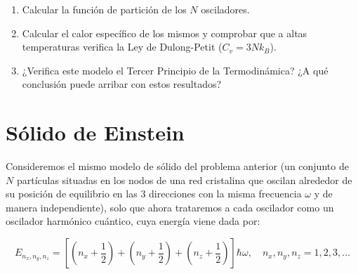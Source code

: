 \documentclass[a4paper,11pt]{article}
\begin{document}
\begin{enumerate}[label=(\alph*),
                  leftmargin=2\parindent,
                  rightmargin=2\parindent]
                  
    \item{Calcular la función de partición de los $N$ osciladores.}

    \item{Calcular el calor específico de los mismos y comprobar que a 
          altas temperaturas verifica la Ley de Dulong-Petit
          ($C_v = 3Nk_B$).}

    \item{¿Verifica este modelo el Tercer Principio de la 
          Termodinámica? ¿A qué conclusión puede arribar con estos 
          resultados?}

\end{enumerate}



\section{Sólido de Einstein}
\label{sec:oscilador-clasico}

Consideremos el mismo modelo de sólido del problema anterior (un 
conjunto de $N$ partículas situadas en los nodos de una red cristalina 
que oscilan alrededor de su posición de equilibrio en las 3 direcciones 
con la misma frecuencia $\omega$ y de manera independiente), solo que 
ahora trataremos a cada oscilador como un oscilador harmónico 
cuántico, cuya energía viene dada por:

$$
E_{n_x, n_y, n_z} = \left[
                    \left( n_x + \frac{1}{2} \right) + 
                    \left( n_y + \frac{1}{2} \right) +
                    \left( n_z + \frac{1}{2} \right)
                    \right]
                    \hbar \omega,
\quad
n_x, n_y, n_z = 1, 2, 3, \dots
$$
\end{document}
